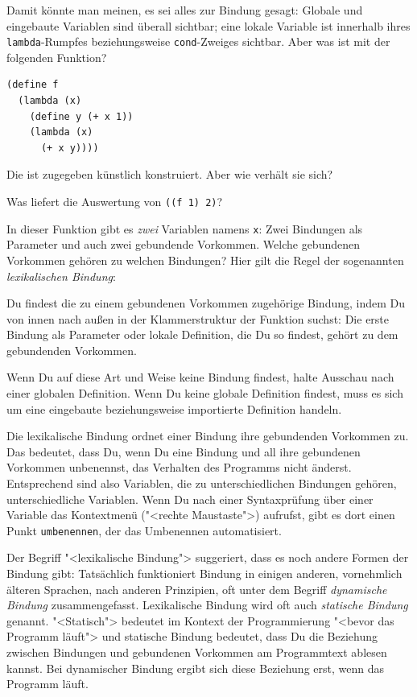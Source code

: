 Damit könnte man meinen, es sei alles zur Bindung gesagt: Globale und
eingebaute Variablen sind überall sichtbar; eine lokale Variable ist
innerhalb ihres \lstinline{lambda}-Rumpfes beziehungsweise
\lstinline{cond}-Zweiges sichtbar.  Aber was ist mit der folgenden
Funktion?
%
\begin{lstlisting}
(define f
  (lambda (x)
    (define y (+ x 1))
    (lambda (x)
      (+ x y))))
\end{lstlisting}
%
Die ist zugegeben künstlich konstruiert.  Aber wie verhält sie sich?
%
\begin{aufgabeinline}
  Was liefert die Auswertung von \lstinline{((f 1) 2)}?
\end{aufgabeinline}
%
In dieser Funktion gibt es \emph{zwei} Variablen namens \lstinline{x}:
Zwei Bindungen als Parameter und auch zwei gebundende Vorkommen.
Welche gebundenen Vorkommen gehören zu welchen Bindungen?  Hier gilt
die Regel der sogenannten \textit{lexikalischen Bindung}:
%
\begin{definition}
  Du findest die zu einem gebundenen Vorkommen zugehörige Bindung,
  indem Du von innen nach außen in der Klammerstruktur der Funktion
  suchst: Die erste Bindung als Parameter oder lokale Definition, die
  Du so findest, gehört zu dem gebundenden Vorkommen.

  Wenn Du auf diese Art und Weise keine Bindung findest, halte
  Ausschau nach einer globalen Definition.  Wenn Du keine globale
  Definition findest, muss es sich um eine eingebaute beziehungsweise
  importierte Definition handeln.
\end{definition}
%
Die lexikalische Bindung ordnet einer Bindung ihre gebundenden
Vorkommen zu.  Das bedeutet, dass Du, wenn Du eine Bindung und all
ihre gebundenen Vorkommen unbenennst, das Verhalten des Programms
nicht änderst.  Entsprechend sind also Variablen, die zu
unterschiedlichen Bindungen gehören, unterschiedliche Variablen.  Wenn
Du nach einer Syntaxprüfung über einer Variable das Kontextmenü
("<rechte Maustaste">) aufrufst, gibt es dort einen Punkt
\texttt{umbenennen}, der das Umbenennen automatisiert.

Der Begriff "<lexikalische Bindung"> suggeriert, dass es noch andere
Formen der Bindung gibt: Tatsächlich funktioniert Bindung in einigen
anderen, vornehmlich älteren Sprachen, nach anderen Prinzipien, oft
unter dem Begriff \textit{dynamische Bindung} zusammengefasst.  Lexikalische
Bindung wird oft auch \textit{statische Bindung} genannt.  "<Statisch"> bedeutet
im Kontext der Programmierung "<bevor das Programm läuft"> und
statische Bindung bedeutet, dass Du die Beziehung zwischen Bindungen
und gebundenen Vorkommen am Programmtext ablesen kannst.  Bei
dynamischer Bindung ergibt sich diese Beziehung erst, wenn das
Programm läuft.

